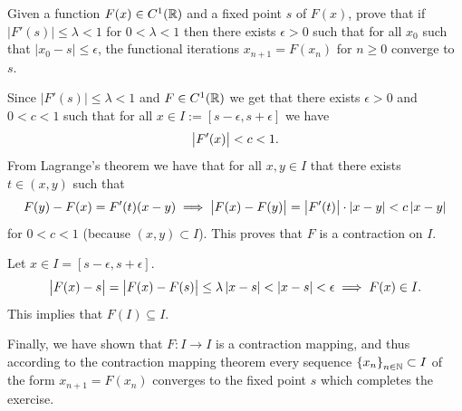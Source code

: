 \documentclass[11pt, a4paper]{article}
\begin{document}
\begin{exercise}
  Given a function $F(x) \in C^1(\mathbb{R})$ and a fixed point $s$ of $F(x)$,
  prove that if $|F'(s)| \le \lambda < 1$ for $0 < \lambda < 1$ then
  there exists $\epsilon > 0$ such that for all $x_0$ such that
  $|x_0 - s| \le \epsilon$, the functional iterations $x_{n+1} = F(x_n)$
  for $n \geq 0$ converge to $s$.
\end{exercise}
\begin{solution}
  Since $|F'(s)| \le \lambda < 1$ and $F \in C^1(\mathbb{R})$ we get that there exists
  $\epsilon > 0$ and $0 < c < 1$ such that for all
  $x \in I := [s - \epsilon, s + \epsilon]$ we have
  \[
    \left\lvert F'(x)\right\rvert < c < 1.
  \]
  From Lagrange's theorem we have that for all
  $x,y \in I$ that there exists $t \in (x,y)$
  such that
  \[
    F(y) - F(x) = F'(t) (x - y) \implies
    \left\lvert F(x)- F(y)\right\rvert = \left\lvert F'(t)\right\rvert \cdot \left\lvert x - y\right\rvert < c \left\lvert x - y\right\rvert
  \]
  for $0 < c < 1$ (because $(x,y) \subset I$).
  This proves that $F$ is a contraction on $I$.

  Let $x \in I = [s - \epsilon, s + \epsilon]$.
  \[
    \left\lvert F(x) - s\right\rvert =
    \left\lvert F(x) - F(s)\right\rvert \le
    \lambda \left\lvert x - s\right\rvert <
    \left\lvert x - s\right\rvert <
    \epsilon \implies F(x) \in I.
  \]
  This implies that $F(I) \subseteq I$.

  Finally, we have shown that $F \colon I \to I$ is a contraction mapping,
  and thus according to the contraction mapping theorem every sequence
  $\left\{x_n\right\}_{n \in \mathbb{N}} \subset I$ of the form $x_{n+1} = F(x_n)$ converges to
  the fixed point $s$ which completes the exercise.
\end{solution}
\end{document}
